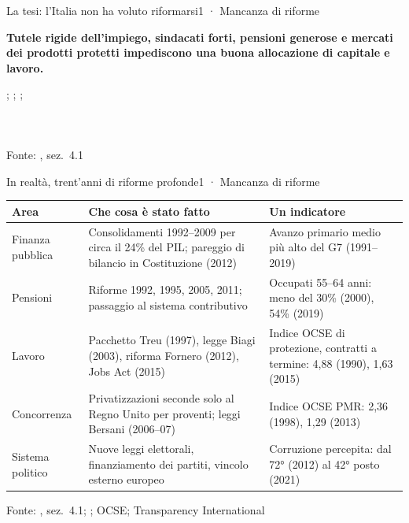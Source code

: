 \documentclass[aspectratio=169,10pt]{beamer}
\newcommand{\fonte}[1]{\vfill{\tiny\color{muted}#1\par}}
\newcommand{\cardrule}{{\color{ink}\rule{\linewidth}{0.8pt}}\par\vspace{0.4em}}
\newcommand{\card}[2]{\cardrule{\raggedright\color{ink}\bfseries #1\par}\vspace{0.3em}{\small\raggedright #2\par}}
\begin{document}
\begin{frame}{La tesi: l’Italia non ha voluto riformarsi}{1 · Mancanza di riforme}
  \vspace{0.6em}
  {\large\color{ink}\bfseries Tutele rigide dell’impiego, sindacati forti, pensioni generose e mercati dei prodotti protetti impediscono una buona allocazione di capitale e lavoro.\par}
  \vspace{0.5em}
  {\scriptsize\color{muted}\citet{daveri2000}; \citet{alesina2006}; \citet{oecd2012}; \citet{tokarski2019}\par}
  \vfill
  \begin{columns}[T]
    \card{Incompleta}{Negli ultimi trent’anni le riforme ci sono state, e molte.}
    \card{Fuorviante}{È proprio la natura delle riforme fatte a offrire l’indizio più utile sulle cause.}
  \end{columns}
  \fonte{Fonte: \citet{krahe2023}, sez.~4.1}
\end{frame}

\begin{frame}{In realtà, trent’anni di riforme profonde}{1 · Mancanza di riforme}
  \vspace{0.4em}
  \scriptsize
  \begin{tabularx}{\textwidth}{@{}>{\raggedright}p{}>{\raggedright}X>{\raggedright\arraybackslash}p{}@{}}
    \toprule
    \color{ink}\bfseries Area & \color{ink}\bfseries Che cosa è stato fatto & \color{ink}\bfseries Un indicatore \\
    \midrule
    Finanza pubblica & Consolidamenti 1992–2009 per circa il 24\% del PIL; pareggio di bilancio in Costituzione (2012) & Avanzo primario medio più alto del G7 (1991–2019) \\[0.4em]
    Pensioni & Riforme 1992, 1995, 2005, 2011; passaggio al sistema contributivo & Occupati 55–64 anni: meno del 30\% (2000), 54\% (2019) \\[0.4em]
    Lavoro & Pacchetto Treu (1997), legge Biagi (2003), riforma Fornero (2012), Jobs Act (2015) & Indice OCSE di protezione, contratti a termine: 4,88 (1990), 1,63 (2015) \\[0.4em]
    Concorrenza & Privatizzazioni seconde solo al Regno Unito per proventi; leggi Bersani (2006–07) & Indice OCSE PMR: 2,36 (1998), 1,29 (2013) \\[0.4em]
    Sistema politico & Nuove leggi elettorali, finanziamento dei partiti, vincolo esterno europeo & Corruzione percepita: dal 72° (2012) al 42° posto (2021) \\
    \bottomrule
  \end{tabularx}
  \fonte{Fonte: \citet{krahe2023}, sez.~4.1; \citet{devries2011}; OCSE; Transparency International}
\end{frame}
\end{document}
